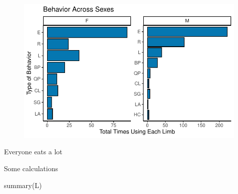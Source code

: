 \documentclass[
  letterpaper,
  DIV=11,
  numbers=noendperiod]{scrartcl}
\newenvironment{Shaded}{\begin{snugshade}}{\end{snugshade}}
\newcommand{\FunctionTok}[1]{\textcolor[rgb]{0.28,0.35,0.67}{#1}}
\newcommand{\NormalTok}[1]{\textcolor[rgb]{0.00,0.23,0.31}{#1}}
\begin{document}
\begin{figure}[H]

{\centering \includegraphics{LeftyLemurs_files/figure-pdf/unnamed-chunk-22-1.pdf}

}

\end{figure}

Everyone eats a lot

Some calculations

\begin{Shaded}
\begin{Highlighting}[]
\FunctionTok{summary}\NormalTok{(L)}
\end{Highlighting}
\end{Shaded}
\end{document}
